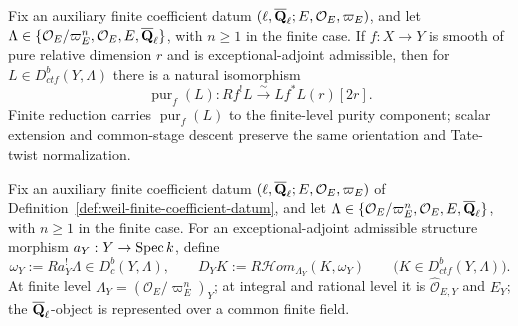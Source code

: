 \begin{proposition}
\label{prop:smooth-purity}


Fix an auxiliary finite coefficient datum
\((\ell,\overline{\mathbf Q}_\ell;E,\mathcal O_E,\varpi_E)\), and let
\(\Lambda\in\{\mathcal O_E/\varpi_E^n,\mathcal O_E,E,\overline{\mathbf Q}_\ell\}\), with
\(n\geq1\) in the finite case.  If \(f:X\to Y\) is smooth of pure relative
dimension \(r\) and is
exceptional-adjoint admissible, then for
\(L\in D^b_{ctf}(Y,\Lambda)\) there is a natural isomorphism
\[
 \operatorname{pur}_f(L):Rf^!L\xrightarrow{\sim}Lf^*L(r)[2r].
\]
Finite reduction carries \(\operatorname{pur}_f(L)\) to the finite-level
purity component; scalar extension and common-stage descent preserve the
same orientation and Tate-twist normalization.
\end{proposition}


\begin{definition}
\label{def:verdier-duality-functor}


Fix an auxiliary finite coefficient datum
\((\ell,\overline{\mathbf Q}_\ell;E,\mathcal O_E,\varpi_E)\) of
Definition~\ref{def:weil-finite-coefficient-datum}, and let
\(\Lambda\in\{\mathcal O_E/\varpi_E^n,\mathcal O_E,E,\overline{\mathbf Q}_\ell\}\), with
\(n\geq1\) in the finite case.  For an exceptional-adjoint admissible
structure morphism
\(a_Y:Y\to\operatorname{Spec} k\), define
\[
 \omega_Y:=Ra_Y^!\Lambda\in D^b_c(Y,\Lambda),
 \qquad
 D_YK:=R\mathcal Hom_{\Lambda_Y}(K,\omega_Y)
 \qquad\bigl(K\in D^b_{ctf}(Y,\Lambda)\bigr).
\]
At finite level \(\Lambda_Y=(\mathcal O_E/\varpi_E^n)_Y\); at integral and
rational level it is \(\widehat{\mathcal O}_{E,Y}\) and \(E_Y\); the
\(\overline{\mathbf Q}_\ell\)-object is represented over a common finite field.
\end{definition}


